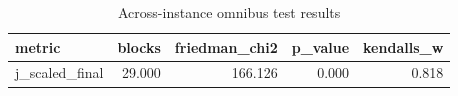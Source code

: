 \begin{table}[!t]
\centering
\caption{Across-instance omnibus test results}
\label{tab:friedman_omnibus_generated}
\begin{tabular}{lrrrr}
\toprule
metric & blocks & friedman_chi2 & p_value & kendalls_w \\
\midrule
j_scaled_final & 29.000 & 166.126 & 0.000 & 0.818 \\
\bottomrule
\end{tabular}

\end{table}